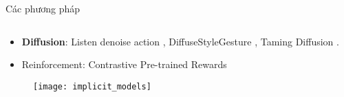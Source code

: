 \begin{frame}{Các phương pháp}
\begin{columns}
\begin{column}{0.5\textwidth}
{\begin{itemize}
			\item \textbf{Diffusion}: Listen denoise action \cite{alexanderson2023listen}, DiffuseStyleGesture \cite{yang2023diffusestylegesture}, Taming Diffusion \cite{zhu2023taming}.
			
			\item Reinforcement: Contrastive Pre-trained Rewards \cite{sun2023co}
 \end{itemize}
 
 \begin{figure}
 	\texttt{[image: implicit\_models]}
 \end{figure}
 
		}
	\end{column}
\end{columns}

%	

	


	

\end{frame}
